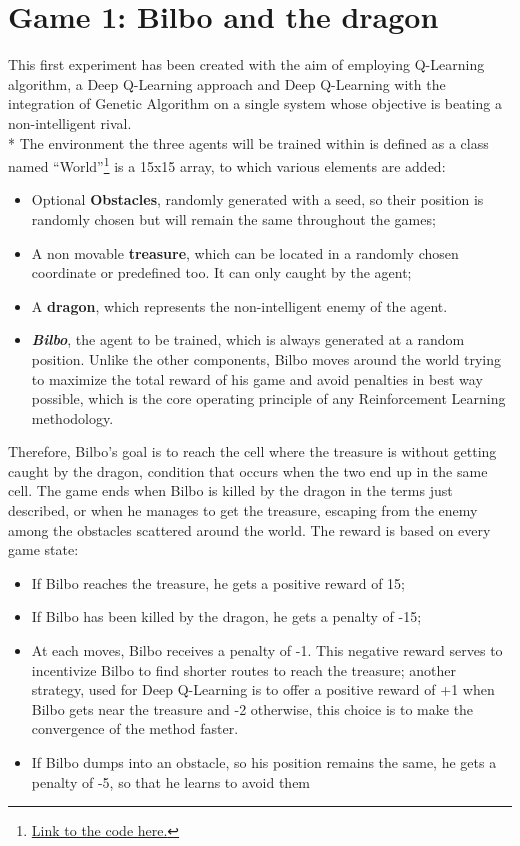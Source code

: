 \section{Game 1: Bilbo and the dragon}
This first experiment has been created with the aim of employing Q-Learning algorithm, a Deep Q-Learning approach and Deep Q-Learning with the integration of Genetic Algorithm on a single system whose objective is beating a non-intelligent rival.\\*
The environment the three agents will be trained within is defined as a class named ``World''\footnote{\href{https://github.com/moiraghif/DragonHunting/blob/master/Bilbo\%20World/CreateBilboWorld.py}{Link to the code here.}} is a 15x15 array, to which various elements are added:
\begin{itemize}[noitemsep, topsep=0ex]
  \item Optional \textbf{Obstacles}, randomly generated with a seed, so their position is randomly chosen but will remain the same throughout the games;
  \item A non movable \textbf{treasure}, which can be located in a randomly chosen coordinate or predefined too. It can only caught by the agent;
  \item A \textbf{dragon}, which represents the non-intelligent enemy of the agent.
  \item \textit{\textbf{Bilbo}}, the agent to be trained, which is always generated at a random position. Unlike the other components, Bilbo moves around the world trying to maximize the total reward of his game and avoid penalties in best way possible, which is the core operating principle of any Reinforcement Learning methodology.
\end{itemize}
Therefore, Bilbo's goal is to reach the cell where the treasure is without getting caught by the dragon, condition that occurs when the two end up in the same cell. The game ends when Bilbo is killed by the dragon in the terms just described, or when he manages to get the treasure, escaping from the enemy among the obstacles scattered around the world. The reward is based on every game state:
\begin{itemize}[noitemsep, topsep=0ex]
  \item If Bilbo reaches the treasure, he gets a positive reward of 15;
  \item If Bilbo has been killed by the dragon, he gets a penalty of -15;
  \item At each moves, Bilbo receives a penalty of -1. This negative reward serves to incentivize Bilbo to find shorter routes to reach the treasure; another strategy, used for Deep Q-Learning is to offer a positive reward of +1 when Bilbo gets near the treasure and -2 otherwise, this choice is to make the convergence of the method faster.
  \item If Bilbo dumps into an obstacle, so his position remains the same, he gets a penalty of -5, so that he learns to avoid them
\end{itemize}
